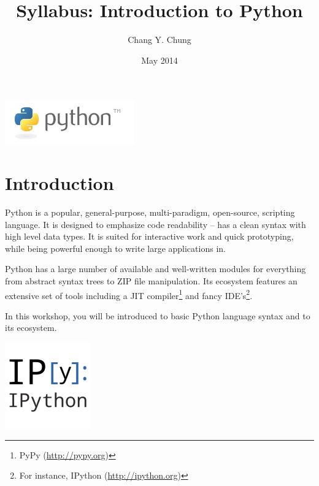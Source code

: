 \documentclass{tufte-handout}
\title{Syllabus: Introduction to Python}
\author{Chang Y. Chung}
\date{May 2014}
\begin{document}
\maketitle

\begin{marginfigure}%
  \includegraphics[width=\linewidth]{python}
  \caption{Python logo from \url{http://www.python.org}. The name is not
    after those dangerous reptiles; it is from the seventies comedy series
    ``Monte Python's Flying Circus''.}
  \label{fig:Python}
\end{marginfigure} 

\section{Introduction}\label{sec:introduction}
Python is a popular, general-purpose, multi-paradigm,
open-source, scripting language. It is designed to emphasize code
readability -- has a clean syntax with high level data types. It is
suited for interactive work and quick prototyping, while being powerful
enough to write large applications in.

Python has a large number of available and well-written modules for
everything from abstract syntax trees to ZIP file manipulation. Its
ecosystem features an extensive set of tools including a JIT
compiler\footnote{PyPy (\url{http://pypy.org})} and fancy
IDE's\footnote{For instance, IPython (\url{http://ipython.org})}.

In this workshop, you will be introduced to basic Python
language syntax and to its ecosystem.

\begin{marginfigure}%
  \includegraphics[width=0.4\linewidth]{ipython}
  \caption{IPython (\url{http://ipython.org}) is a rich architecture for
    interactive computing. Version 2.0 was released on April, 2014.}
  \label{fig:IPython}
\end{marginfigure} 
\end{document}
